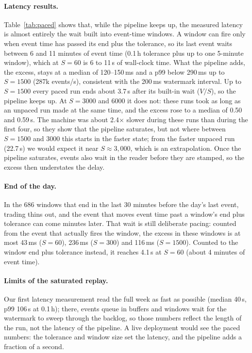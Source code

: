 \documentclass[sigconf,nonacm]{acmart}
\begin{document}
\paragraph{Latency results.} Table~\ref{tab:paced} shows that, while the
pipeline keeps up, the measured latency is almost entirely the wait built into
event-time windows. A window can fire only when event time has passed its end
plus the tolerance, so its last event waits between 6 and 11 minutes of event
time (0.1\,h tolerance plus up to one 5-minute window), which at $S{=}60$ is 6
to 11\,s of wall-clock time. What the pipeline adds, the excess, stays at a
median of 120--150\,ms and a p99 below 290\,ms up to $S{=}1500$ (287k
events/s), consistent with the 200\,ms watermark interval. Up to $S{=}1500$
every paced run ends about 3.7\,s after its built-in wait ($V/S$), so the
pipeline keeps up. At $S{=}3000$ and $6000$ it does not: these runs took as
long as an unpaced run made at the same time, and the excess rose to a median
of 0.50 and 0.59\,s. The machine was about 2.4$\times$ slower during these
runs than during the first four, so they show that the pipeline saturates, but
not where between $S{=}1500$ and $3000$ this starts in the faster state; from
the faster unpaced run (22.7\,s) we would expect it near $S \approx 3{,}000$,
which is an extrapolation. Once the pipeline saturates, events also wait in
the reader before they are stamped, so the excess then understates the delay.

\paragraph{End of the day.} In the 686 windows that end in the last 30 minutes
before the day's last event, trading thins out, and the event that moves event
time past a window's end plus tolerance can come minutes later. That wait is
still deliberate pacing: counted from the event that actually fires the window,
the excess in these windows is at most 43\,ms ($S{=}60$), 236\,ms ($S{=}300$)
and 116\,ms ($S{=}1500$). Counted to the window end plus tolerance instead, it
reaches 4.1\,s at $S{=}60$ (about 4 minutes of event time).

\paragraph{Limits of the saturated replay.} Our first latency measurement read
the full week as fast as possible (median 40\,s, p99 106\,s at 0.1\,h); there,
events queue in buffers and windows wait for the watermark to sweep through the
backlog, so those numbers reflect the length of the run, not the latency of the
pipeline. A live deployment would see the paced numbers: the tolerance and
window size set the latency, and the pipeline adds a fraction of a second.
\end{document}
